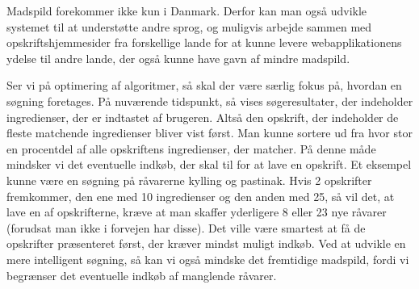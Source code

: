 Madspild forekommer ikke kun i Danmark. Derfor kan man også udvikle systemet til at understøtte andre sprog, og muligvis arbejde sammen med opskriftshjemmesider fra forskellige lande for at kunne levere webapplikationens ydelse til andre lande, der også kunne have gavn af mindre madspild.

Ser vi på optimering af algoritmer, så skal der være særlig fokus på, hvordan en søgning foretages. På nuværende tidspunkt, så vises søgeresultater, der indeholder ingredienser, der er indtastet af brugeren. Altså den opskrift, der indeholder de fleste matchende ingredienser bliver vist først. Man kunne \fx sortere ud fra hvor stor en procentdel af alle opskriftens ingredienser, der matcher. På denne måde mindsker vi det eventuelle indkøb, der skal til for at lave en opskrift. 
Et eksempel kunne være en søgning på råvarerne kylling og pastinak. Hvis 2 opskrifter fremkommer, den ene med 10 ingredienser og den anden med 25, så vil det, at lave en af opskrifterne, kræve at man skaffer yderligere 8 eller 23 nye råvarer (forudsat man ikke i forvejen har disse). Det ville være smartest at få de opskrifter præsenteret først, der kræver mindst muligt indkøb. Ved at udvikle en mere intelligent søgning, så kan vi også mindske det fremtidige madspild, fordi vi begrænser det eventuelle indkøb af manglende råvarer.
